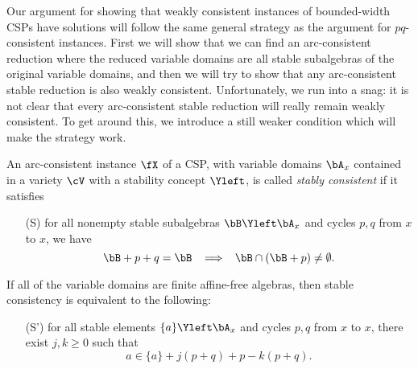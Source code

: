 Our argument for showing that weakly consistent instances of bounded-width CSPs have solutions will follow the same general strategy as the argument for $pq$-consistent instances. First we will show that we can find an arc-consistent reduction where the reduced variable domains are all stable subalgebras of the original variable domains, and then we will try to show that any arc-consistent stable reduction is also weakly consistent. Unfortunately, we run into a snag: it is not clear that every arc-consistent stable reduction will really remain weakly consistent. To get around this, we introduce a still weaker condition which will make the strategy work.

\begin{defn} An arc-consistent instance $\fX$ of a CSP, with variable domains $\bA_x$ contained in a variety $\cV$ with a stability concept $\Yleft$, is called \emph{stably consistent} if it satisfies
\begin{itemize}
\item[(S)] for all nonempty stable subalgebras $\bB \Yleft \bA_x$ and cycles $p,q$ from $x$ to $x$, we have
\[
\bB + p + q = \bB \;\; \implies \;\; \bB \cap (\bB + p) \ne \emptyset.
\]
\end{itemize}
\end{defn}

If all of the variable domains are finite affine-free algebras, then stable consistency is equivalent to the following:
\begin{itemize}
\item[(S')] for all stable elements $\{a\} \Yleft \bA_x$ and cycles $p,q$ from $x$ to $x$, there exist $j,k \ge 0$ such that
\[
a \in \{a\} + j(p+q) + p - k(p+q).
\]
\end{itemize}

